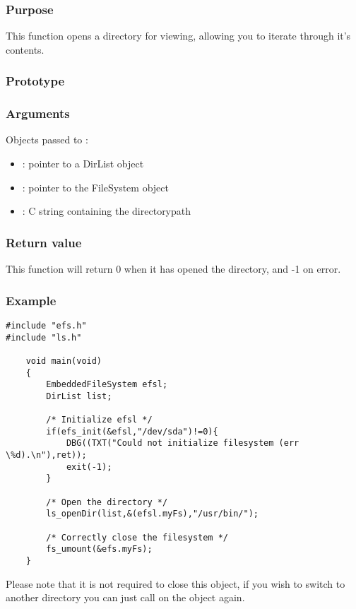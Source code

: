 \subsubsection*{Purpose}
This function opens a directory for viewing, allowing you to iterate through
it's contents.
\subsubsection*{Prototype}
\subsubsection*{Arguments}
Objects passed to :
\begin{itemize}
	\item{: pointer to a DirList object}
	\item{: pointer to the FileSystem object}
	\item{: C string containing the directorypath}
\end{itemize}
\subsubsection*{Return value}
This function will return 0 when it has opened the directory, and -1 on error.\\

\subsubsection*{Example}
\lstset{numbers=left, stepnumber=1, numberstyle=\small, numbersep=5pt, tabsize=4}
\begin{lstlisting}
#include "efs.h"
#include "ls.h"

	void main(void)
	{
		EmbeddedFileSystem efsl;
		DirList list;

		/* Initialize efsl */
		if(efs_init(&efsl,"/dev/sda")!=0){
			DBG((TXT("Could not initialize filesystem (err \%d).\n"),ret));
			exit(-1);
		}
		
		/* Open the directory */
		ls_openDir(list,&(efsl.myFs),"/usr/bin/");

		/* Correctly close the filesystem */
		fs_umount(&efs.myFs);
	}
\end{lstlisting}

Please note that it is not required to close this object, if you wish to switch
to another directory you can just call  on the object again.
